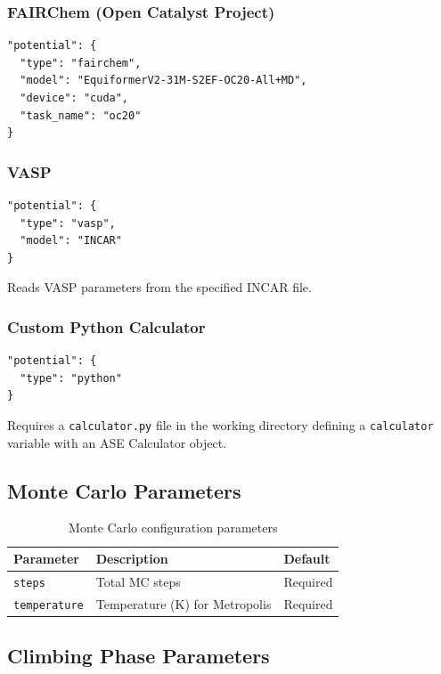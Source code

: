 \documentclass[11pt,a4paper]{article}
\begin{document}
\subsubsection{FAIRChem (Open Catalyst Project)}
\begin{lstlisting}[style=jsonStyle]
"potential": {
  "type": "fairchem",
  "model": "EquiformerV2-31M-S2EF-OC20-All+MD",
  "device": "cuda",
  "task_name": "oc20"
}
\end{lstlisting}

\subsubsection{VASP}
\begin{lstlisting}[style=jsonStyle]
"potential": {
  "type": "vasp",
  "model": "INCAR"
}
\end{lstlisting}
Reads VASP parameters from the specified INCAR file.

\subsubsection{Custom Python Calculator}
\begin{lstlisting}[style=jsonStyle]
"potential": {
  "type": "python"
}
\end{lstlisting}
Requires a \texttt{calculator.py} file in the working directory defining a \texttt{calculator} variable with an ASE Calculator object.

\subsection{Monte Carlo Parameters}
\begin{table}[h]
\centering
\begin{tabular}{lll}
\toprule
\textbf{Parameter} & \textbf{Description} & \textbf{Default} \\
\midrule
\texttt{steps} & Total MC steps & Required \\
\texttt{temperature} & Temperature (K) for Metropolis & Required \\
\bottomrule
\end{tabular}
\caption{Monte Carlo configuration parameters}
\end{table}

\subsection{Climbing Phase Parameters}
\end{document}
